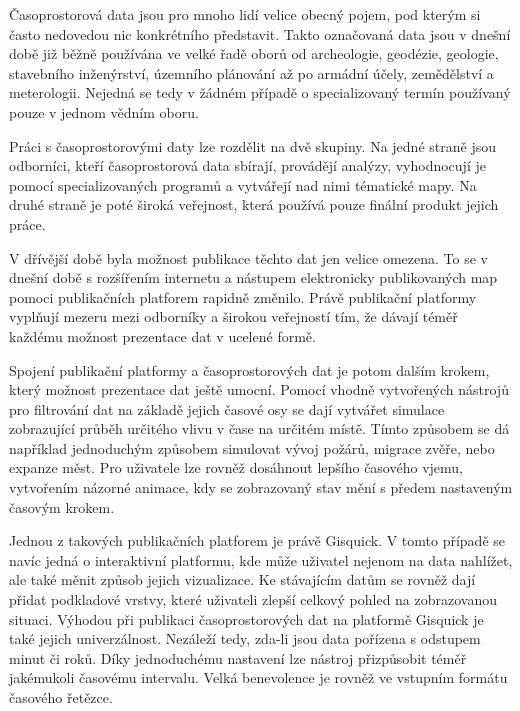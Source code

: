 
Časoprostorová data jsou pro mnoho lidí velice obecný pojem, pod
kterým si často nedovedou nic konkrétního představit. Takto označovaná
data jsou v dnešní době již běžně používána ve velké řadě oborů od
archeologie, geodézie, geologie, stavebního inženýrství, územního
plánování až po armádní účely, zemědělství a meterologii. Nejedná se
tedy v žádném případě o specializovaný termín používaný pouze v jednom
vědním oboru.

Práci s časoprostorovými daty lze rozdělit na dvě skupiny. Na jedné straně
jsou odborníci, kteří časoprostorová data sbírají, provádějí analýzy,
vyhodnocují je pomocí specializovaných programů a vytvářejí nad nimi
tématické mapy. Na druhé straně je poté široká veřejnost, která
používá pouze finální produkt jejich práce.

V dřívější době byla možnost publikace těchto dat jen velice
omezena. To se v dnešní době s rozšířením internetu a nástupem
elektronicky publikovaných map pomoci publikačních platforem rapidně
změnilo. Právě publikační platformy vyplňují mezeru mezi odborníky a
širokou veřejností tím, že dávají téměř každému možnost prezentace dat v
ucelené formě.


Spojení publikační platformy a časoprostorových dat je potom dalším
krokem, který možnost prezentace dat ještě umocní. Pomocí vhodně
vytvořených nástrojů pro filtrování dat na základě jejich časové osy
se dají vytvářet simulace zobrazující průběh určitého vlivu v čase na
určitém místě. Tímto způsobem se dá například jednoduchým způsobem
simulovat vývoj požárů, migrace zvěře, nebo expanze měst. Pro
uživatele lze rovněž dosáhnout lepšího časového vjemu, vytvořením
názorné animace, kdy se zobrazovaný stav mění s předem nastaveným
časovým krokem.

Jednou z takových publikačních platforem je právě Gisquick. V tomto
případě se navíc jedná o interaktivní platformu, kde může uživatel
nejenom na data nahlížet, ale také měnit způsob jejich vizualizace. Ke
stávajícím datům se rovněž dají přidat podkladové vrstvy, které
uživateli zlepší celkový pohled na zobrazovanou situaci. Výhodou při
publikaci časoprostorových dat na platformě Gisquick je také jejich
univerzálnost. Nezáleží tedy, zda-li jsou data pořízena s odstupem minut či
roků. Díky jednoduchému nastavení lze nástroj přizpůsobit téměř
jakémukoli časovému intervalu. Velká benevolence je rovněž ve vstupním
formátu časového řetězce.

